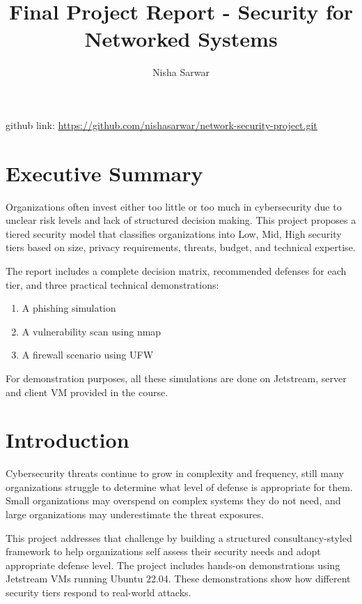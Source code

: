 \documentclass{article}
\title{Final Project Report - Security for Networked Systems}
\author{Nisha Sarwar}
\begin{document}
\maketitle

github link: \href{https://github.com/nishasarwar/network-security-project.git}{https://github.com/nishasarwar/network-security-project.git}

\section{Executive Summary}

Organizations often invest either too little or too much in cybersecurity due to unclear risk levels and lack of structured decision making. This project proposes a tiered security model that classifies organizations into Low, Mid, High security tiers based on size, privacy requirements, threats, budget, and technical expertise. 

The report includes a complete decision matrix, recommended defenses for each tier, and three practical technical demonstrations:
\begin{enumerate}
    \item A phishing simulation
    \item A vulnerability scan using nmap
    \item A firewall scenario using UFW
\end{enumerate}

For demonstration purposes, all these simulations are done on Jetstream, server and client VM provided in the course. 

\section{Introduction}

Cybersecurity threats continue to grow in complexity and frequency, still many organizations struggle to determine what level of defense is appropriate for them. Small organizations may overspend on complex systems they do not need, and large organizations may underestimate the threat exposures. 

This project addresses that challenge by building a structured consultancy-styled framework to help organizations self assess their security needs and adopt appropriate defense level. The project includes hands-on demonstrations using Jetstream VMs running Ubuntu 22.04. These demonstrations show how different security tiers respond to real-world attacks. 
\end{document}
